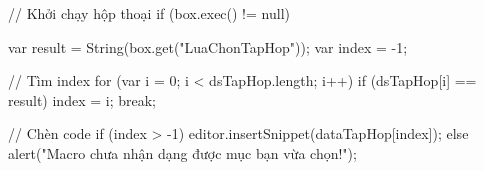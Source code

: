 // Khởi chạy hộp thoại
if (box.exec() != null) {
	var result = String(box.get("LuaChonTapHop"));
	var index = -1;
	
	// Tìm index
	for (var i = 0; i < dsTapHop.length; i++) {
		if (dsTapHop[i] == result) {
			index = i;
			break;
		}
	}
	
	// Chèn code
	if (index > -1) {
		editor.insertSnippet(dataTapHop[index]);
	} else {
		alert("Macro chưa nhận dạng được mục bạn vừa chọn!");
	}
}